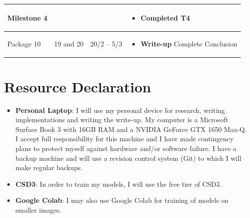 \documentclass{article}
\begin{document}
\begin{longtable}{p{2.5cm}p{1.5cm}P{2.5cm}P{6.8cm}}
    \textbf{Milestone 4} &
    &
    &
    \begin{itemize}[label={--},noitemsep,leftmargin=*,topsep=0pt,partopsep=0pt]
        \item Completed \textbf{T4}
    \end{itemize}\\
    \hline
    
    Package 10 &
    19 and 20  &
    20/2 -- 5/3 &
    \begin{itemize}[label={--},noitemsep,leftmargin=*,topsep=0pt,partopsep=0pt]
        \item \textbf{Write-up} Complete Conclusion
    \end{itemize}\\

\bottomrule
\end{longtable}

\section{Resource Declaration}

\begin{itemize}
    \item \textbf{Personal Laptop}: I will use my personal device for research, writing implementations and writing the write-up. My computer is a Microsoft Surface Book 3 with 16GB RAM and a NVIDIA GeForce GTX 1650 Max-Q. I accept full responsibility for this machine and I have made contingency plans to protect myself against hardware and/or software failure. I have a backup machine and will use a revision control system (Git) to which I will make regular backups.
    \item \textbf{CSD3}: In order to train my models, I will use the free tier of CSD3.
    \item \textbf{Google Colab}: I may also use Google Colab for training of models on smaller images.
\end{itemize}

\newpage
\printbibliography[
heading=bibintoc,
title={References}
]
\end{document}
